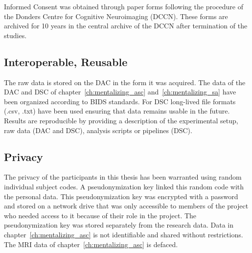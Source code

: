 Informed Consent was obtained through paper forms following the procedure of the Donders Centre for Cognitive Neuroimaging (DCCN). These forms are archived for 10 years in the central archive of the DCCN after termination of the studies. 
    
\subsection*{Interoperable, Reusable}
The raw data is stored on the DAC in the form it was acquired. The data of the DAC and DSC of chapter~\ref{ch:mentalizing_asc} and~\ref{ch:mentalizing_sa} have been organized according to BIDS standards. For DSC long-lived file formats (.csv, .txt) have been used ensuring that data remains usable in the future. Results are reproducible by providing a description of the experimental setup, raw data (DAC and DSC), analysis scripts or pipelines (DSC).

\subsection*{Privacy}
The privacy of the participants in this thesis has been warranted using random individual subject codes. A pseudonymization key linked this random code with the personal data. This pseudonymization key was encrypted with a password and stored on a network drive that was only accessible to members of the project who needed access to it because of their role in the project. The pseudonymization key was stored separately from the research data. Data in chapter~\ref{ch:mentalizing_asc} is not identifiable and shared without restrictions. The MRI data of chapter~\ref{ch:mentalizing_asc} is defaced.

